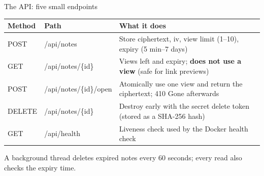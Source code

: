 \documentclass[aspectratio=169,11pt]{beamer}
\newcommand{\hl}[1]{\textcolor{cobalt}{\textbf{#1}}}
\newcommand{\muted}[1]{\textcolor{mist}{#1}}
\newcommand{\code}[1]{{\ttfamily\small #1}}
\begin{document}
\begin{frame}{The API: five small endpoints}
  \small
  \begin{tabularx}{\textwidth}{@{}l l X@{}}
    \toprule
    \textbf{Method} & \textbf{Path} & \textbf{What it does} \\
    \midrule
    \code{POST}   & \code{/api/notes}             & Store \code{ciphertext}, \code{iv}, view limit (1--10), expiry (5 min--7 days) \\
    \code{GET}    & \code{/api/notes/\{id\}}      & Views left and expiry; \hl{does not use a view} (safe for link previews) \\
    \code{POST}   & \code{/api/notes/\{id\}/open} & Atomically use one view and return the ciphertext; \code{410 Gone} afterwards \\
    \code{DELETE} & \code{/api/notes/\{id\}}      & Destroy early with the secret delete token (stored as a SHA-256 hash) \\
    \code{GET}    & \code{/api/health}            & Liveness check used by the Docker health check \\
    \bottomrule
  \end{tabularx}
  \vspace{0.8em}

  \muted{A background thread deletes expired notes every 60 seconds; every read also checks the expiry time.}
\end{frame}
\end{document}
